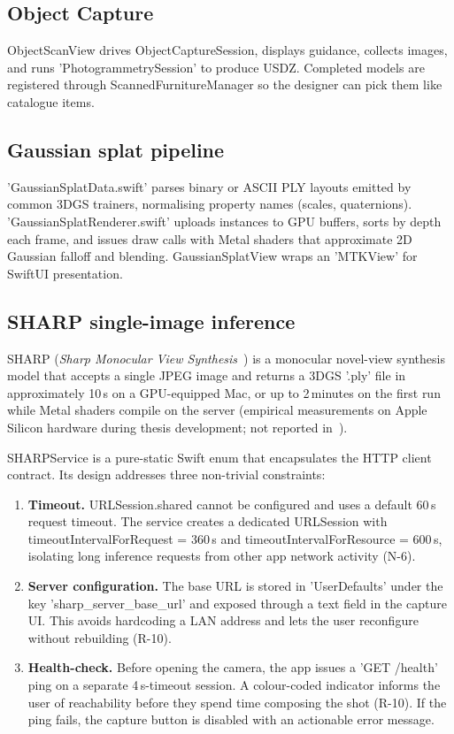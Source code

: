 \subsection{Object Capture}

ObjectScanView drives ObjectCaptureSession, displays guidance, collects images, and runs 'PhotogrammetrySession' to produce USDZ. Completed models are registered through ScannedFurnitureManager so the designer can pick them like catalogue items.

\subsection{Gaussian splat pipeline}

'GaussianSplatData.swift' parses binary or ASCII PLY layouts emitted by common 3DGS trainers, normalising property names (scales, quaternions). 'GaussianSplatRenderer.swift' uploads instances to GPU buffers, sorts by depth each frame, and issues draw calls with Metal shaders that approximate 2D Gaussian falloff and blending. GaussianSplatView wraps an 'MTKView' for SwiftUI presentation.

\subsection{SHARP single-image inference}
\label{sec:sharp_implementation}

SHARP (\emph{Sharp Monocular View Synthesis}~\cite{sharp-monocular-view}) is a monocular novel-view synthesis model that accepts a single JPEG image and returns a 3DGS '.ply' file in approximately 10\,s on a GPU-equipped Mac, or up to 2\,minutes on the first run while Metal shaders compile on the server (empirical measurements on Apple Silicon hardware during thesis development; not reported in~\cite{sharp-monocular-view}).

SHARPService is a pure-static Swift enum that encapsulates the HTTP client contract. Its design addresses three non-trivial constraints:

\begin{enumerate}
    \item \textbf{Timeout.} URLSession.shared cannot be configured and uses a default 60\,s request timeout. The service creates a dedicated URLSession with timeoutIntervalForRequest = 360\,s and timeoutIntervalForResource = 600\,s, isolating long inference requests from other app network activity (N-6).

    \item \textbf{Server configuration.} The base URL is stored in 'UserDefaults' under the key 'sharp\_server\_base\_url' and exposed through a text field in the capture UI. This avoids hardcoding a LAN address and lets the user reconfigure without rebuilding (R-10).

    \item \textbf{Health-check.} Before opening the camera, the app issues a 'GET /health' ping on a separate 4\,s-timeout session. A colour-coded indicator informs the user of reachability before they spend time composing the shot (R-10). If the ping fails, the capture button is disabled with an actionable error message.
\end{enumerate}

